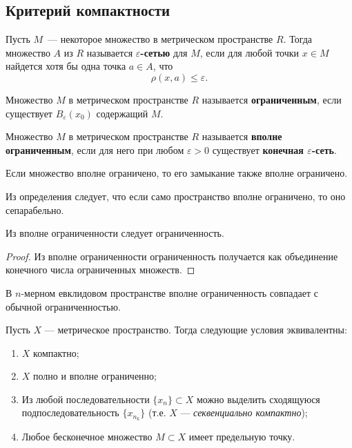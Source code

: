 \subsection{Критерий компактности}
\begin{definition}\label{varepsilon-net}
	Пусть $M$~--- некоторое множество в метрическом пространстве $R$. Тогда множество $A$ из $R$ называется \textbf{$\varepsilon$-сетью} для $M$, если для любой точки $x \in M$ найдется хотя бы одна точка $a \in A$, что
	\[\rho(x, a) \leqslant \varepsilon.\]
\end{definition}

\begin{definition}[Ограниченность]
	Множество $M$ в метрическом пространстве $R$ называется \textbf{ограниченным}, если существует $B_\varepsilon(x_0)$ содержащий $M$.
\end{definition}

\begin{definition}
	Множество $M$ в метрическом пространстве $R$ называется \textbf{вполне ограниченным}, если для него при любом $\varepsilon > 0$ существует \textbf{конечная $\varepsilon$-сеть}.
\end{definition}

\begin{remark}
	Если множество вполне ограничено, то его замыкание также вполне ограничено.
\end{remark}

\begin{remark}
	Из определения следует, что если само пространство вполне ограничено, то оно сепарабельно.
\end{remark}

\begin{remark}
	Из вполне ограниченности следует ограниченность.
\end{remark}

\begin{proof}
	Из вполне ограниченности ограниченность получается как объединение конечного числа ограниченных множеств.
\end{proof}

\begin{remark}
	В $n$-мерном евклидовом пространстве вполне ограниченность совпадает с обычной ограниченностью.
\end{remark}

\begin{theorem}\label{thm3.2}
	Пусть $X$ --- метрическое пространство. Тогда следующие условия эквивалентны:
	\begin{enumerate}
		\item $X$ компактно;
		\item $X$ полно и вполне ограниченно;
		\item Из любой последовательности $\{x_n\} \subset X$ можно выделить сходящуюся подпоследовательность $\{x_{n_k}\}$ (т.е. $X$ — \textit{секвенциально компактно});
		\item Любое бесконечное множество $M \subset X$ имеет предельную точку.
	\end{enumerate}
\end{theorem}

